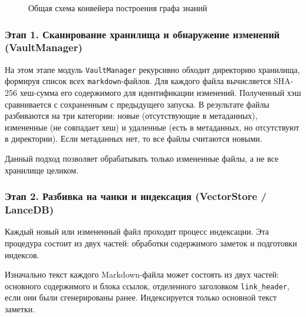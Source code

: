 \begin{figure}[H]
    \caption{Общая схема конвейера построения графа знаний}
    \label{fig:pipeline}
\end{figure}

\subsubsection*{Этап 1. Сканирование хранилища и обнаружение изменений (VaultManager)}
На этом этапе модуль \texttt{VaultManager} рекурсивно обходит директорию хранилища,
формируя список всех \texttt{markdown}-файлов.
Для каждого файла вычисляется SHA-256 хеш-сумма его содержимого для идентификации изменений.
Полученный хэш сравнивается с сохраненным с предыдущего запуска.
В результате файлы разбиваются на три категории: новые (отсутствующие в метаданных),
измененные (не совпадает хеш) и удаленные (есть в метаданных, но отсутствуют в директории).
Если метаданных нет, то все файлы считаются новыми.

Данный подход позволяет обрабатывать только измененные файлы,
а не все хранилище целиком.

\subsubsection*{Этап 2. Разбивка на чанки и индексация (VectorStore / LanceDB)}
Каждый новый или измененный файл проходит процесс индексации.
Эта процедура состоит из двух частей: обработки содержимого заметок и подготовки индексов.

Изначально текст каждого Markdown-файла может состоять из двух частей:
основного содержимого и блока ссылок, отделенного заголовком \texttt{link\_header},
если они были сгенерированы ранее.
Индексируется только основной текст заметки.

